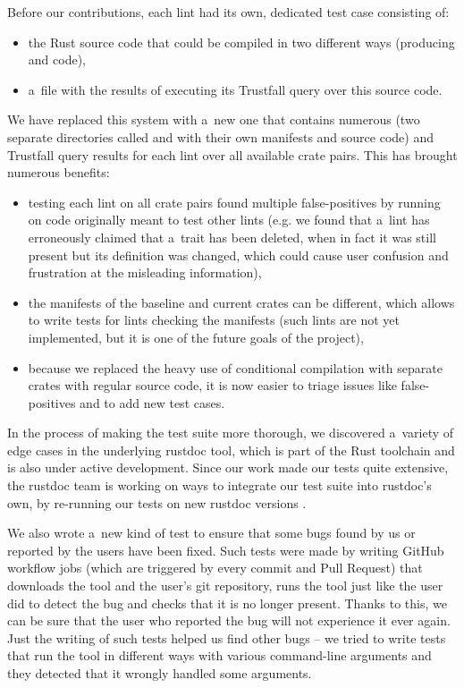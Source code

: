 \documentclass[licencjacka,en]{pracamgr}
\begin{document}
Before our contributions, each lint had its own, dedicated test case consisting of:
\begin{itemize}
\item the Rust source code that could be compiled in two different ways (producing
 and  code),
\item a~file with the results of executing its Trustfall query over this source code.
\end{itemize}
We have replaced this system with a~new one that contains numerous 
(two separate directories called  and  with their own
manifests and source code) and Trustfall query results for each lint over all
available crate pairs. This has brought numerous benefits:
\begin{itemize}
	\item testing each lint on all crate pairs found multiple false-positives by running
		on code originally meant to test other lints
		(e.g. we found that a~lint has erroneously claimed that a~trait
		has been deleted, when in fact it was still present but its definition
		was changed, which could cause user confusion and frustration at the
		misleading information),
	\item the manifests of the baseline and current crates can be different,
		which allows to write tests for lints checking the manifests
		(such lints are not yet implemented, but it is one of the future goals
		of the project),
	\item because we replaced the heavy use of conditional compilation with separate crates
		with regular source code, it is now easier to triage issues like false-positives
		and to add new test cases.
\end{itemize}
In the process of making the test suite more thorough,
we discovered a~variety of edge cases in the underlying rustdoc tool,
which is part of the Rust toolchain and is also under active development.
Since our work made our tests quite extensive,
the rustdoc team is working on ways to integrate our test suite into rustdoc's own,
by re-running our tests on new rustdoc versions \cite{issue-rustdoc-our-tests}.

We also wrote a~new kind of test to ensure that some bugs found by us or reported by the users
have been fixed. Such tests were made by writing GitHub workflow jobs (which are triggered by every
commit and Pull Request) that downloads the tool and the user's git repository,
runs the tool just like the user did to detect the bug
and checks that it is no longer present.
Thanks to this, we can be sure that the user who reported the bug
will not experience it ever again.
Just the writing of such tests helped us find other bugs
-- we tried to write tests that run the tool in different ways
with various command-line arguments and they detected that it wrongly handled some arguments.
\end{document}
